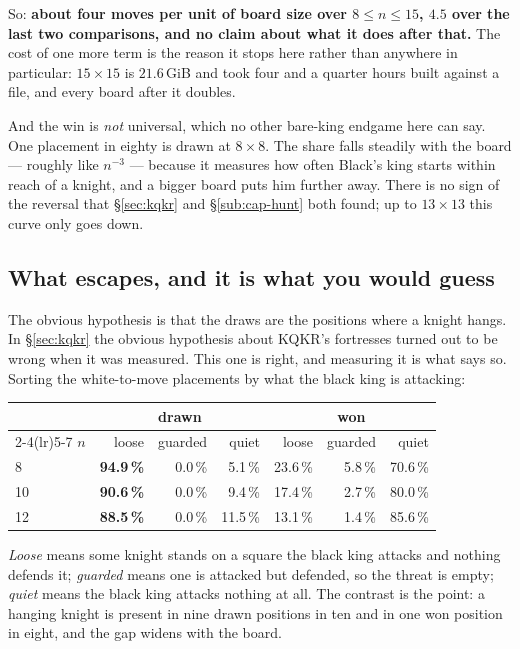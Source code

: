 \documentclass[11pt]{article}
\begin{document}
\smallskip
\noindent
So: \textbf{about four moves per unit of board size over $8 \le n \le 15$,
$4.5$ over the last two comparisons, and no claim about what it does after
that.} The cost of one more term is the reason it stops here rather than
anywhere in particular: $15\times15$ is $21.6$\,GiB and took four and a
quarter hours built against a file, and every board after it doubles.

\smallskip
\noindent
And the win is \emph{not} universal, which no other bare-king endgame here can
say. One placement in eighty is drawn at $8\times8$. The share falls steadily
with the board --- roughly like $n^{-3}$ --- because it measures how often
Black's king starts within reach of a knight, and a bigger board puts him
further away. There is no sign of the reversal that \S\ref{sec:kqkr} and \S\ref{sub:cap-hunt} both found;
up to $13\times13$ this curve only goes down.

\subsection{What escapes, and it is what you would guess}\label{sub:kn-escape}

The obvious hypothesis is that the draws are the positions where a knight
hangs. In \S\ref{sec:kqkr} the obvious hypothesis about KQKR's fortresses turned out to be
wrong when it was measured. This one is right, and measuring it is what says
so. Sorting the white-to-move placements by what the black king is attacking:

\begin{center}\small
\begin{tabular}{@{}lrrrrrr@{}}
\toprule
& \multicolumn{3}{c}{\textbf{drawn}} & \multicolumn{3}{c}{\textbf{won}} \\
\cmidrule(lr){2-4}\cmidrule(lr){5-7}
$n$ & loose & guarded & quiet & loose & guarded & quiet \\
\midrule
 8 & \textbf{94.9\,\%} & 0.0\,\% &  5.1\,\% & 23.6\,\% & 5.8\,\% & 70.6\,\% \\
10 & \textbf{90.6\,\%} & 0.0\,\% &  9.4\,\% & 17.4\,\% & 2.7\,\% & 80.0\,\% \\
12 & \textbf{88.5\,\%} & 0.0\,\% & 11.5\,\% & 13.1\,\% & 1.4\,\% & 85.6\,\% \\
\bottomrule
\end{tabular}
\end{center}

\noindent
\emph{Loose} means some knight stands on a square the black king attacks and
nothing defends it; \emph{guarded} means one is attacked but defended, so the
threat is empty; \emph{quiet} means the black king attacks nothing at all. The
contrast is the point: a hanging knight is present in nine drawn positions in
ten and in one won position in eight, and the gap widens with the board.
\end{document}
